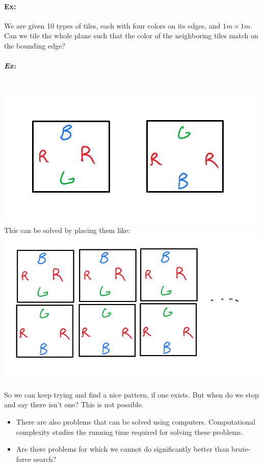 \documentclass[12 pt]{article}
\begin{document}
          \paragraph{Ex:} We are given 10 types of tiles, each with
          four colors on its edges, and $1m \times 1 m$. Can we tile
          the whole plane such that the color of the neighboring tiles
          match on the bounding edge?
          \subparagraph{Ex:} ~
          \\ \includegraphics[width=.9\textwidth]{i111.pdf}
          \\ This can be solved by placing them like:
          \\ \includegraphics[width=.9\textwidth]{i112.pdf}
          
          So we can keep trying and find a nice pattern, if one
          exists. But when do we stop and say there isn't one? This is
          not possible.
          \begin{itemize}
          \item There are also problems that can be solved using
            computers. Computational complexity studies the running
            time required for solving these problems.
          \item Are there problems for which we cannot do
            significantly better than brute-force search?
          \end{itemize}
\end{document}
